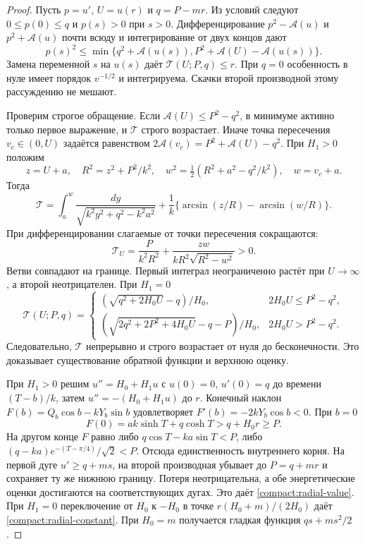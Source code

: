 \begin{proof}
Пусть $p=u'$, $U=u(r)$ и $q=P-mr$. Из условий следуют
$0\le p(0)\le q$ и $p(s)>0$ при $s>0$.
Дифференцирование $p^2-\mathcal A(u)$ и
$p^2+\mathcal A(u)$ почти всюду и интегрирование от двух концов дают
\begin{equation}\label{energy:two-sided}
 p(s)^2\le\min\{q^2+\mathcal A(u(s)),
                  P^2+\mathcal A(U)-\mathcal A(u(s))\}.
\end{equation}
Замена переменной $s$ на $u(s)$ даёт $\mathcal T(U;P,q)\le r$.
При $q=0$ особенность в нуле имеет порядок $v^{-1/2}$ и интегрируема.
Скачки второй производной этому рассуждению не мешают.

Проверим строгое обращение. Если $\mathcal A(U)\le P^2-q^2$,
в минимуме активно только первое выражение, и $\mathcal T$
строго возрастает. Иначе точка пересечения $v_c\in(0,U)$ задаётся
равенством $2\mathcal A(v_c)=P^2+\mathcal A(U)-q^2$.
При $H_1>0$ положим
\[
 z=U+a,\quad R^2=z^2+P^2/k^2,\quad
 w^2=\tfrac12(R^2+a^2-q^2/k^2),\quad w=v_c+a.
\]
Тогда
\[
 \mathcal T=
 \int_a^w\frac{dy}{\sqrt{k^2y^2+q^2-k^2a^2}}
 +\frac1k\{\arcsin(z/R)-\arcsin(w/R)\}.
\]
При дифференцировании слагаемые от точки пересечения сокращаются:
\begin{equation}\label{boundarygap:time-derivative}
 \mathcal T_U=\frac{P}{k^2R^2}
       +\frac{zw}{kR^2\sqrt{R^2-w^2}}>0.
\end{equation}
Ветви совпадают на границе. Первый интеграл неограниченно растёт
при $U\to\infty$, а второй неотрицателен.
При $H_1=0$
\[
 \mathcal T(U;P,q)=
 \begin{cases}
 (\sqrt{q^2+2H_0U}-q)/H_0,&2H_0U\le P^2-q^2,\\[1mm]
 (\sqrt{2q^2+2P^2+4H_0U}-q-P)/H_0,&2H_0U>P^2-q^2.
 \end{cases}
\]
Следовательно, $\mathcal T$ непрерывно и строго возрастает от нуля
до бесконечности. Это доказывает существование обратной функции
и верхнюю оценку.

При $H_1>0$ решим $u''=H_0+H_1u$ с $u(0)=0$, $u'(0)=q$
до времени $(T-b)/k$, затем $u''=-(H_0+H_1u)$ до $r$.
Конечный наклон $F(b)=Q_b\cos b-kY_b\sin b$ удовлетворяет
$F'(b)=-2kY_b\cos b<0$. При $b=0$
\[
 F(0)=ak\sinh T+q\cosh T>q+H_0r\ge P.
\]
На другом конце $F$ равно либо $q\cos T-ka\sin T<P$,
либо $(q-ka)e^{-(T-\pi/4)}/\sqrt2<P$.
Отсюда единственность внутреннего корня.
На первой дуге $u'\ge q+ms$, на второй производная убывает
до $P=q+mr$ и сохраняет ту же нижнюю границу.
Потеря неотрицательна, а обе энергетические оценки достигаются
на соответствующих дугах. Это даёт \eqref{compact:radial-value}.
При $H_1=0$ переключение от $H_0$ к $-H_0$ в точке
$r(H_0+m)/(2H_0)$ даёт \eqref{compact:radial-constant}.
При $H_0=m$ получается гладкая функция $qs+ms^2/2$.


\end{proof}
